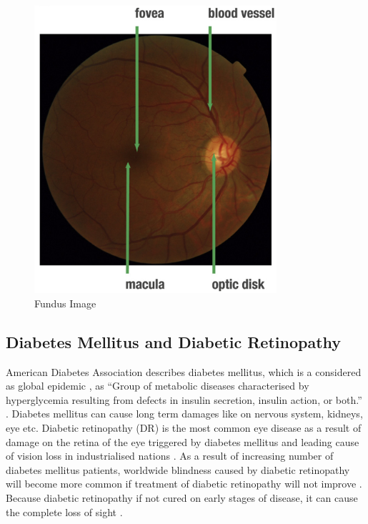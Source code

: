 \begin{figure}[t]
\centering
\includegraphics[width=0.8\textwidth]{Figures/fundus_photography_anatomical}
\caption{Fundus Image \citep{mookiah2015application}}
\label{fundusPhotoRetina}
\end{figure}


\subsection{Diabetes Mellitus and Diabetic Retinopathy}
American Diabetes Association describes diabetes mellitus, which is a considered as global epidemic \citep{falt2012modern}, as ``Group of metabolic diseases characterised by hyperglycemia resulting from defects in insulin secretion, insulin action, or both.'' \citep{national1979classification}. Diabetes mellitus can cause long term damages like on nervous system, kidneys, eye etc. Diabetic retinopathy (DR) is the most common eye disease as a result of damage on the retina of the eye triggered by diabetes mellitus and leading cause of vision loss in industrialised nations \citep{antal2014ensemble, stitt2013advances}. As a result of increasing number of diabetes mellitus patients, worldwide blindness caused by diabetic retinopathy will become more common if treatment of diabetic retinopathy will not improve \citep{wilkinson2003proposed}. Because diabetic retinopathy if not cured on early stages of disease, it can cause the complete loss of sight \citep{rocha2011points}. 

